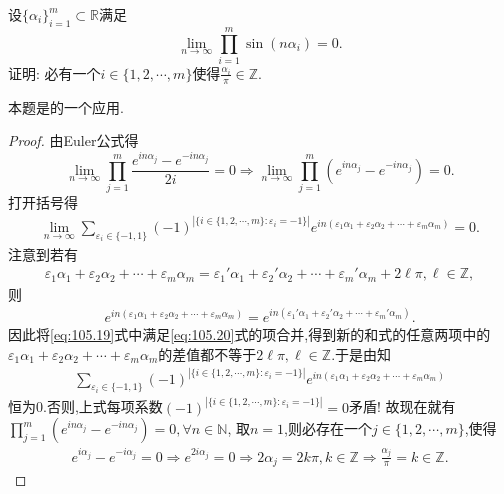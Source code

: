 \documentclass[../../main.tex]{subfiles}
\begin{document}
\begin{example}
设$\{\alpha_i\}_{i=1}^m\subset\mathbb{R}$满足
\[
\lim_{n\to\infty}\prod_{i=1}^m\sin(n\alpha_i)=0.
\]
证明: 必有一个$i\in\{1,2,\cdots,m\}$使得$\frac{\alpha_i}{\pi}\in\mathbb{Z}$.
\end{example}
\begin{note}
本题是的一个应用.
\end{note}
\begin{proof}
由Euler公式得
\[
\lim_{n\to\infty}\prod_{j=1}^m\frac{e^{in\alpha_j}-e^{-in\alpha_j}}{2i}=0\Rightarrow\lim_{n\to\infty}\prod_{j=1}^m(e^{in\alpha_j}-e^{-in\alpha_j})=0.
\]
打开括号得
\begin{align}\label{eq:105.19}
\lim_{n\to\infty}\sum_{\varepsilon_i\in\{-1,1\}}(-1)^{|\{i\in\{1,2,\cdots,m\}:\varepsilon_i=-1\}|}e^{in(\varepsilon_1\alpha_1+\varepsilon_2\alpha_2+\cdots+\varepsilon_m\alpha_m)}=0.
\end{align}
注意到若有
\begin{align}\label{eq:105.20}
\varepsilon _1\alpha _1+\varepsilon _2\alpha _2+\cdots +\varepsilon _m\alpha _m=\varepsilon _1\prime \alpha _1+\varepsilon _2\prime \alpha _2+\cdots +\varepsilon _m\prime \alpha _m+2\ell \pi ,\ell \in \mathbb{Z} ,
\end{align}
则
\begin{align*}
e^{in\left( \varepsilon _1\alpha _1+\varepsilon _2\alpha _2+\cdots +\varepsilon _m\alpha _m \right)}=e^{in\left( \varepsilon _1\prime \alpha _1+\varepsilon _2\prime \alpha _2+\cdots +\varepsilon _m\prime \alpha _m \right)}.
\end{align*}
因此将\eqref{eq:105.19}式中满足\eqref{eq:105.20}式的项合并,得到新的和式的任意两项中的$\varepsilon _1\alpha _1+\varepsilon _2\alpha _2+\cdots +\varepsilon _m\alpha _m$的差值都不等于$2\ell \pi,\ell \in \mathbb{Z}$.于是由知
\begin{align*}
\sum_{\varepsilon_i\in\{-1,1\}}(-1)^{|\{i\in\{1,2,\cdots,m\}:\varepsilon_i=-1\}|}e^{in(\varepsilon_1\alpha_1+\varepsilon_2\alpha_2+\cdots+\varepsilon_m\alpha_m)}
\end{align*}
恒为0.否则,上式每项系数$(-1)^{|\{i\in\{1,2,\cdots,m\}:\varepsilon_i=-1\}|}=0$矛盾!
故现在就有$\prod_{j=1}^m(e^{in\alpha_j}-e^{-in\alpha_j})=0,\forall n\in\mathbb{N}$, 取$n=1$,则必存在一个$j\in\{1,2,\cdots,m\}$,使得
\begin{align*}
e^{i\alpha _j}-e^{-i\alpha _j}=0\Longrightarrow e^{2i\alpha _j}=0\Longrightarrow 2\alpha _j=2k\pi ,k\in \mathbb{Z} \Longrightarrow \frac{\alpha _j}{\pi}=k\in \mathbb{Z} .
\end{align*}
\end{proof}
\end{document}

